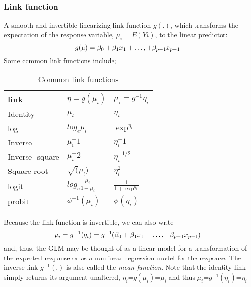 \subsubsection*{Link function}
A smooth and invertible linearizing link function $g(.)$, which transforms the expectation of the response variable, $\mu_i = E(Yi)$, to the linear predictor:
\begin{equation}
	\centering
	g(\mu) = \beta_0 + \beta_1 x_1 + \ldots, + \beta_{p-1}x_{p-1} 
\end{equation}
Some common link functions include;
\begin{table}[H]\caption{Common link functions}
	\centering
	\begin{tabular}{|l|l|l|}
		\hline
		\textbf{link}            & \textbf{$\eta=g(\mu_{i})$}                   & \textbf{$\mu_i=g^{-1}\eta_i$} \\ \hline
		Identity        & $\mu_i$                                              & $\eta_i$                                                \\ \hline
		log             & $log_{e}\mu_i$                                    & $\exp^{\eta_i}$       \\ \hline
		Inverse         & $\mu_{i}^-1$                      &$\eta_{i}^-1$                                                                       \\ \hline
		Inverse- square & $\mu_{i}^-2$                      &$\eta_{i}^{-1/2}$                                                                       \\ \hline
		Square-root     & $\sqrt(\mu_i)$                        &$\eta_{i}^2$ \textbf{}                                                             \\ \hline
		logit           & $log_e \frac{\mu_i}{1-\mu_i}$                                        &$\frac{1}{1+\exp^{\eta_{i}}}$ \textbf{}                                                             \\ \hline
		probit          & $\phi^{-1}(\mu_i)$ &$\phi(\eta_{i})$ \textbf{}                                                             \\ \hline
	\end{tabular}
\end{table}
Because the link function is invertible, we can also write
\begin{equation}
	\centering
	\mu_{i}=g^{-1}(\eta_{i})=g^{-1}(\beta_0 + \beta_1 x_1 + \ldots, + \beta_{p-1}x_{p-1})
\end{equation}
and, thus, the GLM may be thought of as a linear model for a transformation of the expected
response or as a nonlinear regression model for the response. The inverse link $g^{-1}(.)$ is also called the \textit{mean function}.  Note that the identity link simply returns its argument unaltered, $\eta_{i}$=$g(\mu_{i})$=$\mu_{i}$ and thus $\mu_{i}$=$g^{-1}(\eta_{i})$=$\eta_{i}$

